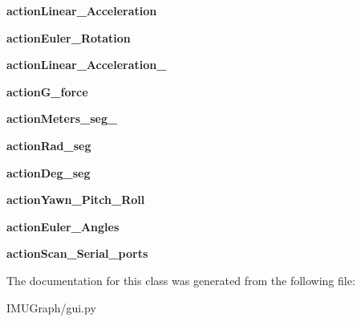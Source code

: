 \begin{DoxyCompactItemize}
\item 
\hypertarget{classgui_1_1_ui___main_window_a194ed355e510756cb9f735aa07c94fe9}{{\bfseries action\-Linear\-\_\-\-Acceleration}}\label{classgui_1_1_ui___main_window_a194ed355e510756cb9f735aa07c94fe9}

\item 
\hypertarget{classgui_1_1_ui___main_window_ac7be810d7eff8c487e35f24f6871940d}{{\bfseries action\-Euler\-\_\-\-Rotation}}\label{classgui_1_1_ui___main_window_ac7be810d7eff8c487e35f24f6871940d}

\item 
\hypertarget{classgui_1_1_ui___main_window_a356c581991692e840734d9dc85a54f47}{{\bfseries action\-Linear\-\_\-\-Acceleration\-\_}}\label{classgui_1_1_ui___main_window_a356c581991692e840734d9dc85a54f47}

\item 
\hypertarget{classgui_1_1_ui___main_window_a72445113fdb988573ed62663299262ab}{{\bfseries action\-G\-\_\-force}}\label{classgui_1_1_ui___main_window_a72445113fdb988573ed62663299262ab}

\item 
\hypertarget{classgui_1_1_ui___main_window_aae9432d44e60809aa10c1782eee6d155}{{\bfseries action\-Meters\-\_\-seg\-\_}}\label{classgui_1_1_ui___main_window_aae9432d44e60809aa10c1782eee6d155}

\item 
\hypertarget{classgui_1_1_ui___main_window_a760a126ef8f76ff5fcf3c0c09d61a951}{{\bfseries action\-Rad\-\_\-seg}}\label{classgui_1_1_ui___main_window_a760a126ef8f76ff5fcf3c0c09d61a951}

\item 
\hypertarget{classgui_1_1_ui___main_window_a5a1a24a90b150d188a3bba43c31f2884}{{\bfseries action\-Deg\-\_\-seg}}\label{classgui_1_1_ui___main_window_a5a1a24a90b150d188a3bba43c31f2884}

\item 
\hypertarget{classgui_1_1_ui___main_window_a50c3bb05de615e54db162cb54107a092}{{\bfseries action\-Yawn\-\_\-\-Pitch\-\_\-\-Roll}}\label{classgui_1_1_ui___main_window_a50c3bb05de615e54db162cb54107a092}

\item 
\hypertarget{classgui_1_1_ui___main_window_a0573105f763807eef541b4de4be1d3e1}{{\bfseries action\-Euler\-\_\-\-Angles}}\label{classgui_1_1_ui___main_window_a0573105f763807eef541b4de4be1d3e1}

\item 
\hypertarget{classgui_1_1_ui___main_window_adfdd860edfc5ae4a29ca3ae5d135b824}{{\bfseries action\-Scan\-\_\-\-Serial\-\_\-ports}}\label{classgui_1_1_ui___main_window_adfdd860edfc5ae4a29ca3ae5d135b824}

\end{DoxyCompactItemize}


The documentation for this class was generated from the following file\-:\begin{DoxyCompactItemize}
\item 
I\-M\-U\-Graph/gui.\-py\end{DoxyCompactItemize}
